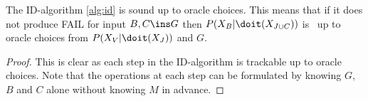\begin{Cor}  
    \label{cor:id-alg-sound-oracle}
    The ID-algorithm \ref{alg:id} is sound up to oracle choices.
    This means that if it does not produce FAIL for input $B, C \ins G$ 
    then $P(X_B|\doit(X_{J \cup C}))$ is \trackable\ up to oracle choices from $P(X_V|\doit(X_J))$ and $G$.
    \begin{proof}
    This is clear as each step in the ID-algorithm is trackable up to oracle choices.
    Note that the operations at each step can be formulated by knowing $G$, $B$ and $C$ alone 
    without knowing $M$ in advance.

    \end{proof}
\end{Cor}

